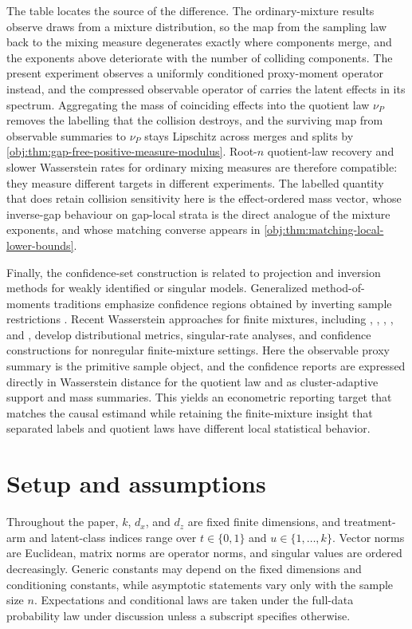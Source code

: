 \documentclass[11pt]{article}
\begin{document}
The table locates the source of the difference. The ordinary-mixture results observe draws from a mixture distribution, so the map from the sampling law back to the mixing measure degenerates exactly where components merge, and the exponents above deteriorate with the number of colliding components. The present experiment observes a uniformly conditioned proxy-moment operator instead, and the compressed observable operator of \citet{VirkMazaheriWu2026} carries the latent effects in its spectrum. Aggregating the mass of coinciding effects into the quotient law \(\nu_P\) removes the labelling that the collision destroys, and the surviving map from observable summaries to \(\nu_P\) stays Lipschitz across merges and splits by \cref{obj:thm:gap-free-positive-measure-modulus}. Root-\(n\) quotient-law recovery and slower Wasserstein rates for ordinary mixing measures are therefore compatible: they measure different targets in different experiments. The labelled quantity that does retain collision sensitivity here is the effect-ordered mass vector, whose inverse-gap behaviour on gap-local strata is the direct analogue of the mixture exponents, and whose matching converse appears in \cref{obj:thm:matching-local-lower-bounds}.

Finally, the confidence-set construction is related to projection and inversion methods for weakly identified or singular models. Generalized method-of-moments traditions emphasize confidence regions obtained by inverting sample restrictions \citep{Hansen1982}. Recent Wasserstein approaches for finite mixtures, including \citet{WuYang2020}, \citet{DossWuYangZhou2023}, \citet{DeoRandrianarisoa2023}, \citet{BingBuneaNilesWeed2025}, and \citet{NilesWeedRigollet2022}, develop distributional metrics, singular-rate analyses, and confidence constructions for nonregular finite-mixture settings. Here the observable proxy summary is the primitive sample object, and the confidence reports are expressed directly in Wasserstein distance for the quotient law and as cluster-adaptive support and mass summaries. This yields an econometric reporting target that matches the causal estimand while retaining the finite-mixture insight that separated labels and quotient laws have different local statistical behavior.


\section{Setup and assumptions}

Throughout the paper, \(k\), \(d_x\), and \(d_z\) are fixed finite dimensions, and treatment-arm and latent-class indices range over \(t\in\{0,1\}\) and \(u\in\{1,\ldots,k\}\). Vector norms are Euclidean, matrix norms are operator norms, and singular values are ordered decreasingly. Generic constants may depend on the fixed dimensions and conditioning constants, while asymptotic statements vary only with the sample size \(n\). Expectations and conditional laws are taken under the full-data probability law under discussion unless a subscript specifies otherwise.
\end{document}
